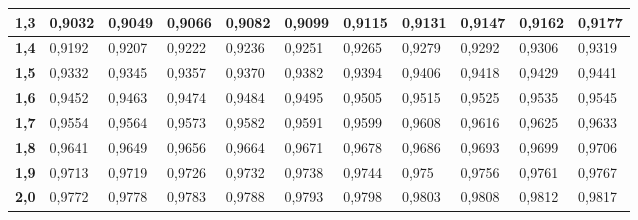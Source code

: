 \documentclass[11pt]{article}%
\begin{document}
\begin{tabular}{|l|l|l|l|l|l|l|l|l|l|l|}
\hline
\textbf{1,3} & 0,9032 & 0,9049 & 0,9066 & 0,9082 & 0,9099 & 0,9115 &
0,9131
 & 0,9147 & 0,9162 & 0,9177 \\
\hline
\textbf{1,4} & 0,9192 & 0,9207 & 0,9222 & 0,9236 & 0,9251 & 0,9265 &
0,9279
 & 0,9292 & 0,9306 & 0,9319 \\
\hline
\textbf{1,5} & 0,9332 & 0,9345 & 0,9357 & 0,9370 & 0,9382 & 0,9394 &
0,9406
 & 0,9418 & 0,9429 & 0,9441 \\
\hline
\textbf{1,6} & 0,9452 & 0,9463 & 0,9474 & 0,9484 & 0,9495 & 0,9505 &
0,9515
 & 0,9525 & 0,9535 & 0,9545 \\
\hline
\textbf{1,7} & 0,9554 & 0,9564 & 0,9573 & 0,9582 & 0,9591 & 0,9599 &
0,9608
 & 0,9616 & 0,9625 & 0,9633 \\
\hline
\textbf{1,8} & 0,9641 & 0,9649 & 0,9656 & 0,9664 & 0,9671 & 0,9678 &
0,9686
 & 0,9693 & 0,9699 & 0,9706 \\
\hline
\textbf{1,9} & 0,9713 & 0,9719 & 0,9726 & 0,9732 & 0,9738 & 0,9744 &
0,975 & 
0,9756 & 0,9761 & 0,9767 \\
\hline
\textbf{2,0} & 0,9772 & 0,9778 & 0,9783 & 0,9788 & 0,9793 & 0,9798 &
0,9803
 & 0,9808 & 0,9812 & 0,9817 \\
\hline
\end{tabular}
\end{document}
